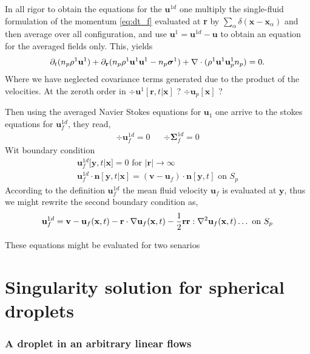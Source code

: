 In all rigor to obtain the equations for the $\textbf{u}^{1d}$ one multiply the single-fluid formulation of the momentum \eqref{eq:dt_f} evaluated at \textbf{r} by $\sum_\alpha \delta(\textbf{x}-\textbf{x}_\alpha)$ and then average over all configuration,  and use $\textbf{u}^1 = \textbf{u}^{1d} - \textbf{u}$ to obtain an equation for the averaged fields only. 
This, yields
\begin{equation*}
    \partial_t (n_p \rho^1 \textbf{u}^1)
    + {\partial_\textbf{r}}  (
        n_p \rho^1 \textbf{u}^1  \textbf{u}^1 
        - n_p \bm\sigma^1
        )
    + \mathbf{\nabla}\cdot (\rho^1 \textbf{u}^1 \textbf{u}_p^1  n_p )
    = 0. 
\end{equation*}
Where we have neglected covariance terms generated due to the product of the velocities.
At the zeroth order in $\div \textbf{u}^1[\textbf{r},t|\textbf{x}]$ ? $\div \textbf{u}_p[\textbf{x}]$ ? 

Then using the averaged Navier Stokes equations for $\textbf{u}_1$ one arrive to the stokes equations for $\textbf{u}_f^{1d}$, they read, 
\begin{align*}
    \div \textbf{u}_f^{1d} = 0 &&
    \div \bm\Sigma_f^{1d} = 0 
\end{align*}
Wit boundary condition 
\begin{align*}
    \textbf{u}_f^{1d}[\textbf{y},t|\textbf{x}] = 0 \text{  for  } |\textbf{r}| \to \infty\\
    \textbf{u}_f^{1d}\cdot \textbf{n}[\textbf{y},t|\textbf{x}] = (\textbf{v} - \textbf{u}_f)\cdot \textbf{n}[\textbf{y},t]\text{  on  } S_p
\end{align*}
According to the definition $\textbf{u}_f^{1d}$ the mean fluid velocity $\textbf{u}_f$ is evaluated at $\textbf{y}$, thus we might rewrite the second boundary condition as, 
\begin{align*}
    \textbf{u}_f^{1d} = \textbf{v} - \textbf{u}_f(\textbf{x},t)
    -\textbf{r}\cdot\mathbf{\nabla}\textbf{u}_f(\textbf{x},t)
    -\frac{1}{2}\textbf{rr}:\mathbf{\nabla}^2\textbf{u}_f(\textbf{x},t)
    \ldots
    \text{  on  } S_p
\end{align*}

These equations might be evaluated for two senarios
\section{Singularity solution for spherical droplets}

\subsubsection*{A droplet in an arbitrary linear flows}

